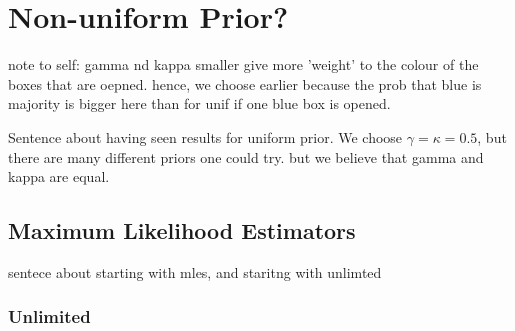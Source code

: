 \section{Non-uniform Prior?}
note to self: gamma nd kappa smaller give more 'weight' to the colour of the boxes that are oepned. hence, we choose earlier because the prob that blue is majority is bigger here than for unif if one blue box is opened. 

Sentence about having seen results for uniform prior. We choose $\gamma=\kappa=0.5$, but there are many different priors one could try. but we believe that gamma and kappa are equal. 

\subsection{Maximum Likelihood Estimators}
sentece about starting with mles, and staritng with unlimted
\subsubsection{Unlimited}

